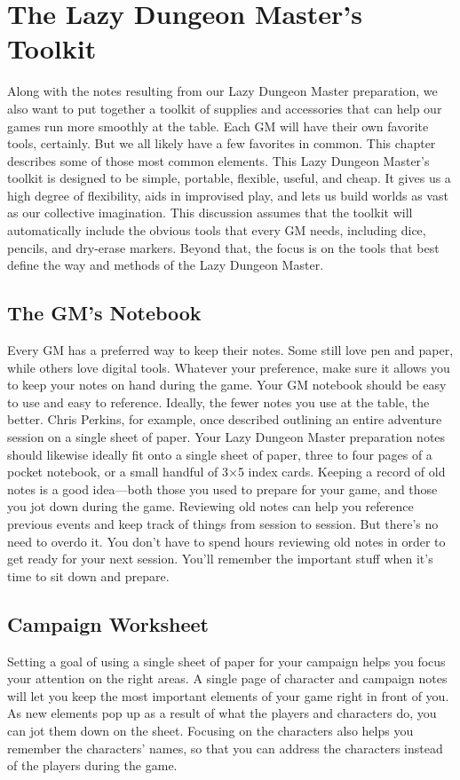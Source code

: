 \documentclass[10pt,a4paper,twoside,bg=print,twocolumn,openany,nodeprecatedcode]{dndbook}
\begin{document}
\section{The Lazy Dungeon Master's Toolkit}
Along with the notes resulting from our Lazy Dungeon Master preparation, we also want to put together a toolkit of supplies and accessories that can help our games run more smoothly at the table. Each GM will have their own favorite tools, certainly. But we all likely have a few favorites in common. This chapter describes some of those most common elements.
This Lazy Dungeon Master's toolkit is designed to be simple, portable, flexible, useful, and cheap. It gives us a high degree of flexibility, aids in improvised play, and lets us build worlds as vast as our collective imagination. This discussion assumes that the toolkit will automatically include the obvious tools that every GM needs, including dice, pencils, and dry-erase markers. Beyond that, the focus is on the tools that best define the way and methods of the Lazy Dungeon Master.
\subsection{The GM's Notebook}
Every GM has a preferred way to keep their notes. Some still love pen and paper, while others love digital tools. Whatever your preference, make sure it allows you to keep your notes on hand during the game. Your GM notebook should be easy to use and easy to reference.
Ideally, the fewer notes you use at the table, the better. Chris Perkins, for example, once described outlining an entire adventure session on a single sheet of paper. Your Lazy Dungeon Master preparation notes should likewise ideally fit onto a single sheet of paper, three to four pages of a pocket notebook, or a small handful of 3×5 index cards.
Keeping a record of old notes is a good idea—both those you used to prepare for your game, and those you jot down during the game. Reviewing old notes can help you reference previous events and keep track of things from session to session. But there's no need to overdo it. You don't have to spend hours reviewing old notes in order to get ready for your next session. You'll remember the important stuff when it's time to sit down and prepare.
\subsection{Campaign Worksheet}
Setting a goal of using a single sheet of paper for your campaign helps you focus your attention on the right areas. A single page of character and campaign notes will let you keep the most important elements of your game right in front of you. As new elements pop up as a result of what the players and characters do, you can jot them down on the sheet. Focusing on the characters also helps you remember the characters' names, so that you can address the characters instead of the players during the game.
\end{document}
